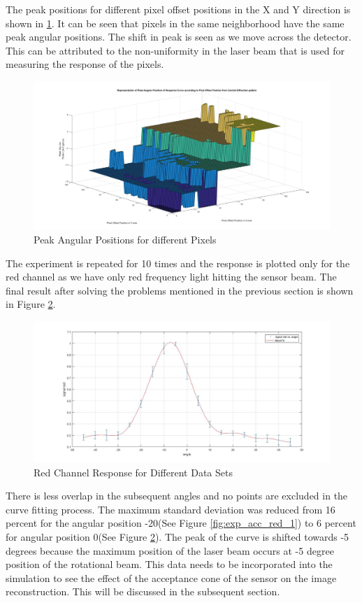 The peak positions for different pixel offset positions in the X and Y direction is shown in \ref{fig:peak_pixel_pos}. It can be seen that pixels in the same neighborhood have the same peak angular positions. The shift in peak is seen as we move across the detector. This can be attributed to the non-uniformity in the laser beam that is used for measuring the response of the pixels.
\begin{figure}[!h]
\centering
\includegraphics[scale=0.225]{pics/MeshPlotAngularPeak.jpg}
\caption{Peak Angular Positions for different Pixels}
\label{fig:peak_pixel_pos}
\end{figure}

The experiment is repeated for 10 times and the response is plotted only for the red channel as we have only red frequency light hitting the sensor beam. The final result after solving the problems mentioned in the previous section is shown in Figure \ref{fig:acceptance_final}.
\begin{figure}[!h]
\centering
\includegraphics[scale=0.2125]{pics/FinalCRAExp.jpg}
\caption{Red Channel Response for Different Data Sets}
\label{fig:acceptance_final}
\end{figure}
There is less overlap in the subsequent angles and no points are excluded in the curve fitting process. The maximum standard deviation was reduced from 16 percent for the angular position -20(See Figure \ref{fig:exp_acc_red_1}) to 6 percent for angular position 0(See Figure \ref{fig:acceptance_final}). The peak of the curve is shifted towards -5 degrees because the maximum position of the laser beam occurs at -5 degree position of the rotational beam. This data needs to be incorporated into the simulation to see the effect of the acceptance cone of the sensor on the image reconstruction. This will be discussed in the subsequent section.
